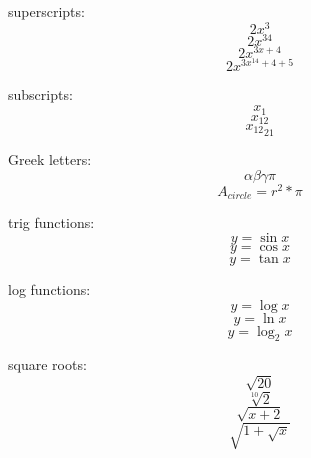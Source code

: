 \documentclass[11]{article}
\begin{document}
superscripts: 
$$ 2x^3 $$ %
$$ 2x^{34} $$ %
$$ 2x^{ 3x + 4} $$
$$ 2x^{ 3x^{14} + 4 + 5} $$ %

subscripts: 
$$ x_1 $$
$$ x_{12} $$
$$ {x_{12}}_{21} $$ %

Greek letters: 
$$ \alpha \beta \gamma \pi $$ %
$$ A_{circle} = r^2 * \pi $$

trig functions: 
$$ y = \sin{x} $$
$$ y = \cos{x} $$
$$ y = \tan{x} $$

log functions: 
$$ y = \log{x} $$
$$ y = \ln{x} $$
$$ y = \log_2{x} $$ %

square roots: 
$$ \sqrt{20} $$
$$ \sqrt[10]{2} $$
$$ \sqrt{x + 2} $$
$$ \sqrt{1 + \sqrt{x}} $$ 
\end{document}
